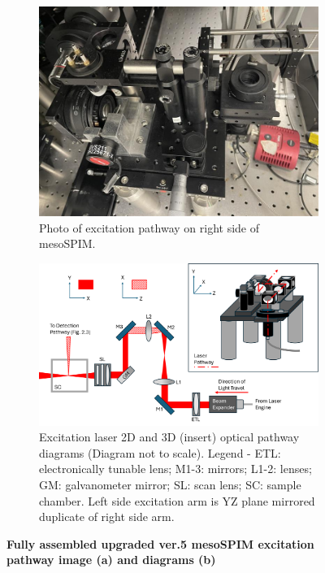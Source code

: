 \begin{figure}[H]
    \centering
    \begin{subfigure}[a]{0.75\textwidth}
    \centering
    \includegraphics[width=1\linewidth]{Images/ExcitationPathPhoto.jpg}
    \caption{Photo of excitation pathway on right side of mesoSPIM.}
    \end{subfigure}
    \medskip
    
    \begin{subfigure}[b]{0.75\textwidth}
    \centering
    \includegraphics[width=1\linewidth]{Figures/Excitation Diagram.png}
    \caption{Excitation laser 2D and 3D (insert) optical pathway diagrams (Diagram not to scale). Legend - ETL: electronically tunable lens; M1-3: mirrors; L1-2: lenses; GM: galvanometer mirror; SL: scan lens; SC: sample chamber. Left side excitation arm is YZ plane mirrored duplicate of right side arm.}
    \end{subfigure}
    \caption{\textbf{Fully assembled upgraded ver.5 mesoSPIM excitation pathway image (a) and diagrams (b)}}
    \label{fig:enter-label}
\end{figure}

